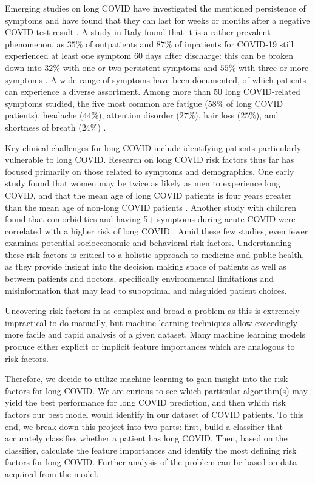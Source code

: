 \documentclass{article}
\begin{document}
Emerging studies on long COVID have investigated the mentioned persistence of symptoms and have found that they can last for weeks or months after a negative COVID test result \citep{DAVIS2021101019}. A study in Italy found that it is a rather prevalent phenomenon, as $35\%$ of outpatients and $87\%$ of inpatients for COVID-19 still experienced at least one symptom 60 days after discharge: this can be broken down into $32\%$ with one or two persistent symptoms and $55\%$ with three or more symptoms \citep{10.1001/jama.2020.12603}. A wide range of symptoms have been documented, of which patients can experience a diverse assortment. Among more than 50 long COVID-related symptoms studied, the five most common are fatigue ($58\%$ of long COVID patients), headache ($44\%$), attention disorder ($27\%$), hair loss ($25\%$), and shortness of breath ($24\%$) \citep{ssrn}. 

Key clinical challenges for long COVID include identifying patients particularly vulnerable to long COVID. Research on long COVID risk factors thus far has focused primarily on those related to symptoms and demographics. One early study found that women may be twice as likely as men to experience long COVID, and that the mean age of long COVID patients is four years greater than the mean age of non-long COVID patients \citep{Nabavim3489}. Another study with children found that comorbidities and having 5+ symptoms during acute COVID were correlated with a higher risk of long COVID \citep{Osmanov2101341}. Amid these few studies, even fewer examines potential socioeconomic and behavioral risk factors. Understanding these risk factors is critical to a holistic approach to medicine and public health, as they provide insight into the decision making space of patients as well as between patients and doctors, specifically environmental limitations and misinformation that may lead to suboptimal and misguided patient choices.

Uncovering risk factors in as complex and broad a problem as this is extremely impractical to do manually, but machine learning techniques allow exceedingly more facile and rapid analysis of a given dataset. Many machine learning models produce either explicit or implicit feature importances which are analogous to risk factors. 

Therefore, we decide to utilize machine learning to gain insight into the risk factors for long COVID. We are curious to see which particular algorithm(s) may yield the best performance for long COVID prediction, and then which risk factors our best model would identify in our dataset of COVID patients. To this end, we break down this project into two parts: first, build a classifier that accurately classifies whether a patient has long COVID. Then, based on the classifier, calculate the feature importances and identify the most defining risk factors for long COVID. Further analysis of the problem can be based on data acquired from the model.
\end{document}
